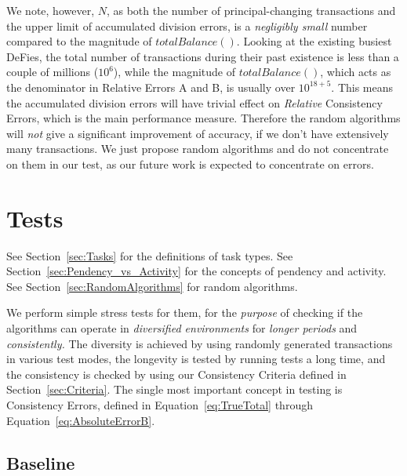 \documentclass{article}
\begin{document}
We note, however, $N$, as both 
the number of principal-changing transactions and 
the upper limit of accumulated division errors, 
is 
a \textit{negligibly small} number compared to the magnitude of $totalBalance()$.
Looking at the existing busiest DeFies, 
the total number of transactions during their past existence 
is less than a couple of millions ($10^6$),
while the magnitude of $totalBalance()$, 
which acts as the denominator in Relative Errors A and B, 
is usually over $10^{18+5}$. 
This means the accumulated division errors will have trivial effect 
on \textit{Relative} Consistency Errors, 
which is the main performance measure.
Therefore the random algorithms will \textit{not} 
give a significant improvement of accuracy, 
if we don't have extensively many transactions.
We just propose random algorithms and do not concentrate on them in our test, 
as our future work is expected to concentrate on errors.

\section{Tests}
\label{sec:Tests}

See Section~\ref{sec:Tasks} for the definitions of task types.
See Section~\ref{sec:Pendency_vs_Activity} for the concepts of 
pendency and activity.
See Section~\ref{sec:RandomAlgorithms} for random algorithms.

We perform simple stress tests for them, for the \textit{purpose} of checking 
if the algorithms can operate in \textit{diversified environments} 
for \textit{longer periods} and \textit{consistently.}
The diversity is achieved by using randomly generated transactions 
in various test modes, 
the longevity is tested by running tests a long time, and 
the consistency is checked by using our Consistency Criteria defined 
in Section~\ref{sec:Criteria}.
The single most important concept in testing is Consistency Errors, 
defined in Equation~\ref{eq:TrueTotal} through Equation~\ref{eq:AbsoluteErrorB}.

\subsection{Baseline}
\label{sec:javascriptTruth}
\end{document}

